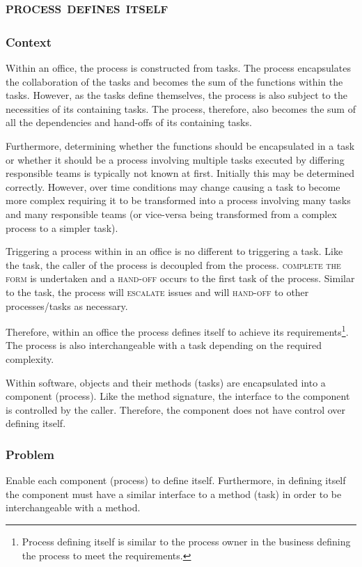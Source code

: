 \documentclass[prodmode]{style/acmlarge}
\begin{document}
\subsection{\textsc{\textbf{process defines itself}}}

\subsubsection*{Context} Within an office, the process is constructed from
tasks.  The process encapsulates the collaboration of the tasks and becomes the
sum of the functions within the tasks.  However, as the tasks define themselves,
the process is also subject to the necessities of its containing tasks.  The
process, therefore, also becomes the sum of all the dependencies and hand-offs
of its containing tasks.

Furthermore, determining whether the functions should be encapsulated in a task
or whether it should be a process involving multiple tasks executed by differing
responsible teams is typically not known at first.  Initially this may be
determined correctly.  However, over time conditions may change causing a
task to become more complex requiring it to be transformed into a process
involving many tasks and many responsible teams (or vice-versa being transformed
from a complex process to a simpler task).

Triggering a process within in an office is no different to triggering a task.
Like the task, the caller of the process is decoupled from the process.
\textsc{complete the form} is undertaken and a \textsc{hand-off} occurs to the
first task of the process.  Similar to the task, the process will
\textsc{escalate} issues and will \textsc{hand-off} to other processes/tasks as
necessary.

Therefore, within an office the process defines itself to achieve its
requirements\footnote{Process defining itself is similar to the process owner in
the business defining the process to meet the requirements.}.  The process is
also interchangeable with a task depending on the required complexity.

Within software, objects and their methods (tasks) are encapsulated into a
component (process).  Like the method signature, the interface to the component
is controlled by the caller.  Therefore, the component does not have control
over defining itself.

\subsubsection*{\textbf{Problem}} Enable each component (process) to define
itself.  Furthermore, in defining itself the component must have a similar
interface to a method (task) in order to be interchangeable with a method.
\end{document}
